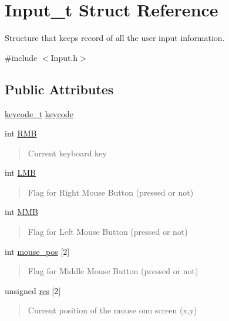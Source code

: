 \hypertarget{struct_input__t}{}\section{Input\+\_\+t Struct Reference}
\label{struct_input__t}


Structure that keeps record of all the user input information.  




{\ttfamily \#include $<$Input.\+h$>$}

\subsection*{Public Attributes}
\begin{DoxyCompactItemize}
\item 
\hyperlink{group___input_ga6e68664bf6d0e0a4dac76a07ae630c52}{keycode\+\_\+t} \hyperlink{struct_input__t_a1664c83ef92405877db0b04d4643a754}{keycode}
\item 
int \hyperlink{struct_input__t_ae9b94c465b22787a021d494d2c57b6d4}{R\+MB}
\begin{DoxyCompactList}\small\item\em \begin{quote}
Current keyboard key \end{quote}
\end{DoxyCompactList}\item 
int \hyperlink{struct_input__t_af71c02dde674d804117e7915929a3e05}{L\+MB}
\begin{DoxyCompactList}\small\item\em \begin{quote}
Flag for Right Mouse Button (pressed or not) \end{quote}
\end{DoxyCompactList}\item 
int \hyperlink{struct_input__t_a39c2b2bb2313e0a3773c2b8cb2bc94c8}{M\+MB}
\begin{DoxyCompactList}\small\item\em \begin{quote}
Flag for Left Mouse Button (pressed or not) \end{quote}
\end{DoxyCompactList}\item 
int \hyperlink{struct_input__t_a9af766f0cb90f3abf804a9203387f932}{mouse\+\_\+pos} \mbox{[}2\mbox{]}
\begin{DoxyCompactList}\small\item\em \begin{quote}
Flag for Middle Mouse Button (pressed or not) \end{quote}
\end{DoxyCompactList}\item 
unsigned \hyperlink{struct_input__t_a0a91455b460723c1fc8fccb30a4021f8}{res} \mbox{[}2\mbox{]}
\begin{DoxyCompactList}\small\item\em \begin{quote}
Current position of the mouse onn screen (x,y) \end{quote}
\end{DoxyCompactList}\end{DoxyCompactItemize}


